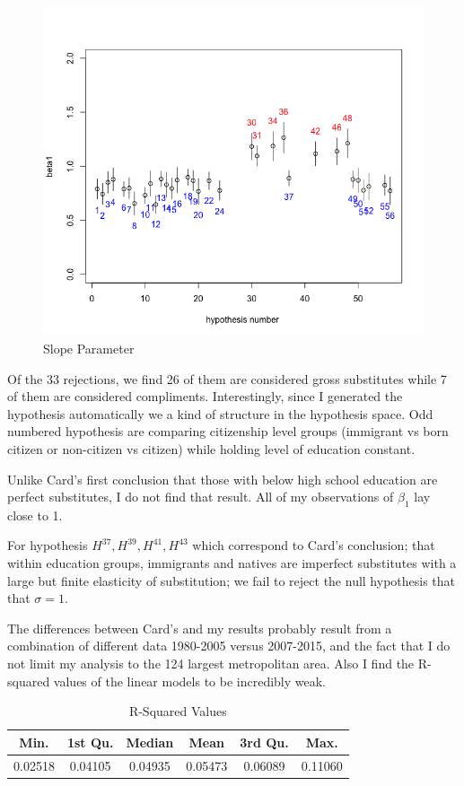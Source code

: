 \documentclass[11pt]{article}
\theoremstyle{definition}
\theoremstyle{remark}
\def\b{\beta}
\def\s{\sigma}
\begin{document}
\begin{figure}[H]
    \centering
    \caption{Slope Parameter}
    \includegraphics[width=.5\textwidth]{slopeFinal.png}

    \label{slo}
\end{figure}




Of the 33 rejections, we find 26 of them are considered gross substitutes while
7 of them are considered compliments. Interestingly, since I generated the
hypothesis automatically we a kind of structure in the hypothesis space.
Odd numbered hypothesis are comparing citizenship level groups
(immigrant vs born citizen or non-citizen vs citizen) while holding level of
education constant.

Unlike Card's first conclusion that those with below high school education are
perfect substitutes, I do not find that result. All of my observations of
$\b_1$ lay close to 1.

For hypothesis $H^{37},H^{39},H^{41},H^{43}$ which correspond
to Card's conclusion; that within education groups, immigrants and natives
are imperfect substitutes with a large but finite elasticity of substitution;
we fail to reject the null hypothesis that that $\s=1$.

The differences between Card's and my results probably result from a combination
of different data 1980-2005 versus 2007-2015, and the fact that I do not limit
my analysis to the 124 largest metropolitan area.
Also I find the R-squared values of the linear models to be incredibly weak.

\begin{table}[H]
    \caption{R-Squared Values}
    \label{rs}
    \centering
    \begin{tabular}{|c|c|c|c|c|c|}
        \hline
        Min. & 1st Qu. &  Median &   Mean & 3rd Qu.  &  Max. \\
        \hline
        0.02518  &0.04105 &0.04935 &0.05473 &0.06089 &0.11060 \\
        \hline
    \end{tabular}
\end{table}
\end{document}
